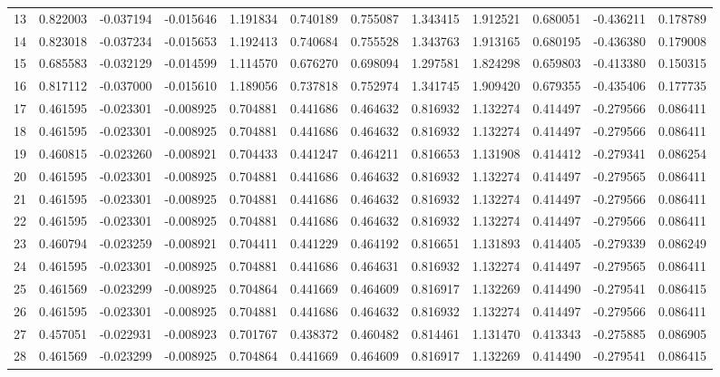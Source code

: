 \begin{landscape}
\begin{longtable}{rlllllllllll}
13 & 0.822003 & -0.037194 & -0.015646 & 1.191834 & 0.740189 & 0.755087 & 1.343415 & 1.912521 & 0.680051 & -0.436211 & 0.178789 \\
14 & 0.823018 & -0.037234 & -0.015653 & 1.192413 & 0.740684 & 0.755528 & 1.343763 & 1.913165 & 0.680195 & -0.436380 & 0.179008 \\
15 & 0.685583 & -0.032129 & -0.014599 & 1.114570 & 0.676270 & 0.698094 & 1.297581 & 1.824298 & 0.659803 & -0.413380 & 0.150315 \\
16 & 0.817112 & -0.037000 & -0.015610 & 1.189056 & 0.737818 & 0.752974 & 1.341745 & 1.909420 & 0.679355 & -0.435406 & 0.177735 \\
17 & 0.461595 & -0.023301 & -0.008925 & 0.704881 & 0.441686 & 0.464632 & 0.816932 & 1.132274 & 0.414497 & -0.279566 & 0.086411 \\
18 & 0.461595 & -0.023301 & -0.008925 & 0.704881 & 0.441686 & 0.464632 & 0.816932 & 1.132274 & 0.414497 & -0.279566 & 0.086411 \\
19 & 0.460815 & -0.023260 & -0.008921 & 0.704433 & 0.441247 & 0.464211 & 0.816653 & 1.131908 & 0.414412 & -0.279341 & 0.086254 \\
20 & 0.461595 & -0.023301 & -0.008925 & 0.704881 & 0.441686 & 0.464632 & 0.816932 & 1.132274 & 0.414497 & -0.279565 & 0.086411 \\
21 & 0.461595 & -0.023301 & -0.008925 & 0.704881 & 0.441686 & 0.464632 & 0.816932 & 1.132274 & 0.414497 & -0.279566 & 0.086411 \\
22 & 0.461595 & -0.023301 & -0.008925 & 0.704881 & 0.441686 & 0.464632 & 0.816932 & 1.132274 & 0.414497 & -0.279566 & 0.086411 \\
23 & 0.460794 & -0.023259 & -0.008921 & 0.704411 & 0.441229 & 0.464192 & 0.816651 & 1.131893 & 0.414405 & -0.279339 & 0.086249 \\
24 & 0.461595 & -0.023301 & -0.008925 & 0.704881 & 0.441686 & 0.464631 & 0.816932 & 1.132274 & 0.414497 & -0.279565 & 0.086411 \\
25 & 0.461569 & -0.023299 & -0.008925 & 0.704864 & 0.441669 & 0.464609 & 0.816917 & 1.132269 & 0.414490 & -0.279541 & 0.086415 \\
26 & 0.461595 & -0.023301 & -0.008925 & 0.704881 & 0.441686 & 0.464632 & 0.816932 & 1.132274 & 0.414497 & -0.279566 & 0.086411 \\
27 & 0.457051 & -0.022931 & -0.008923 & 0.701767 & 0.438372 & 0.460482 & 0.814461 & 1.131470 & 0.413343 & -0.275885 & 0.086905 \\
28 & 0.461569 & -0.023299 & -0.008925 & 0.704864 & 0.441669 & 0.464609 & 0.816917 & 1.132269 & 0.414490 & -0.279541 & 0.086415 \\

\end{longtable}
\end{landscape}

